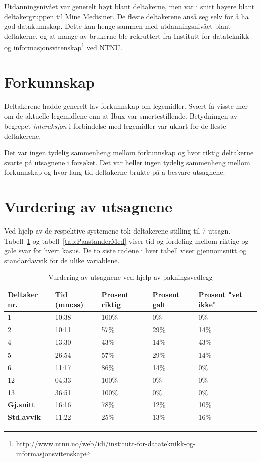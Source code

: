 Utdanningsnivået var generelt høyt blant deltakerne, men var i snitt høyere blant deltakergruppen til Mine Medisiner. De fleste deltakerene anså seg selv for å ha god datakunnskap. Dette kan henge sammen med utdanningsnivået blant deltakerne, og at mange av brukerne ble rekruttert fra Institutt for datateknikk og informasjonsvitenskap\footnote{http://www.ntnu.no/web/idi/institutt-for-datateknikk-og-informasjonsvitenskap} ved NTNU. 


\section{Forkunnskap}
\label{sec:forkunnskap}
Deltakerene hadde generelt lav forkunnskap om legemidler. Svært få visste mer om de aktuelle legemidlene enn at Ibux var smertestillende. Betydningen av begrepet \textit{interaksjon} i forbindelse med legemidler var uklart for de fleste deltakerene. 

Det var ingen tydelig sammenheng mellom forkunnskap og hvor riktig deltakerne svarte på utsagnene i forsøket. Det var heller ingen tydelig sammenheng mellom forkunnskap og hvor lang tid deltakerne brukte på å besvare utsagnene.

\section{Vurdering av utsagnene}
Ved hjelp av de respektive systemene tok deltakerene stilling til 7 utsagn. Tabell~\ref{tab:PaastanderPak} og tabell~\ref{tab:PaastanderMed} viser tid og fordeling mellom riktige og gale svar for hvert kasus. De to siste radene i hver tabell viser gjennomsnitt og standardavvik for de ulike variablene. 

\begin{table}[H]
    \centering
    \begin{tabular}{ | p{2cm} | p{2cm} | p{2cm} | p{2cm} | p{2cm} | }
      \hline
       \textbf{Deltaker nr.} & \textbf{Tid (mm:ss)} & \textbf{Prosent riktig} & \textbf{Prosent galt} & \textbf{Prosent "vet ikke"} \\ \hline
        1 & 10:38 & 100\% & 0\% & 0\% \\ \hline
        2 & 10:11 & 57\% & 29\% & 14\% \\ \hline
        4 & 13:30 & 43\% & 14\% & 43\% \\ \hline
        5 & 26:54 & 57\% & 29\% & 14\% \\ \hline
        6 & 11:17 & 86\% & 14\% & 0\% \\ \hline
        12 & 04:33 & 100\% & 0\% & 0\% \\ \hline
        13 & 36:51 & 100\% & 0\% & 0\% \\ \hline \hline
        \textbf{Gj.snitt} & 16:16 & 78\% & 12\% & 10\% \\ \hline
        \textbf{Std.avvik} & 11:22 & 25\% & 13\% & 16\% \\ \hline
    \end{tabular}
    \caption{Vurdering av utsagnene ved hjelp av pakningsvedlegg}
    \label{tab:PaastanderPak}
\end{table}


